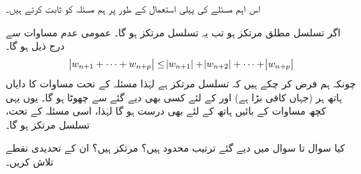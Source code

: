 اس اہم مسئلے کی پہلی استعمال کے طور پر ہم مسئلہ  کو ثابت کرتے ہیں۔

\quad
اگر تسلسل  مطلق مرتکز ہو تب یہ تسلسل مرتکز ہو گا۔
\quad
عمومی عدم مساوات  سے درج ذیل ہو گا۔
\begin{align}\label{مساوات_ترتیب_مطلق_مرتکز_اور_مرتکز_الف}
\abs{w_{n+1}+\cdots+w_{n+p}}\le \abs{w_{n+1}}+\abs{w_{n+2}}+\cdots+\abs{w_{n+p}}
\end{align}
چونکہ ہم فرض کر چکے ہیں کہ تسلسل  مرتکز ہے  لہٰذا مسئلہ  کے تحت  مساوات  کا دایاں ہاتھ   ہر  (جہاں  کافی بڑا ہے) اور  کے لئے کسی بھی دیے گئے  سے چھوٹا ہو گا۔ یوں یہی کچھ مساوات  کے بائیں ہاتھ کے لئے بھی درست ہو گا لہٰذا، اسی مسئلہ کے تحت، تسلسل  مرتکز ہو گا۔

 کیا سوال  تا سوال  میں دیے گئے  ترتیب  محدود ہیں؟ مرتکز ہیں؟ ان کے تحدیدی نقطے تلاش کریں۔ 

